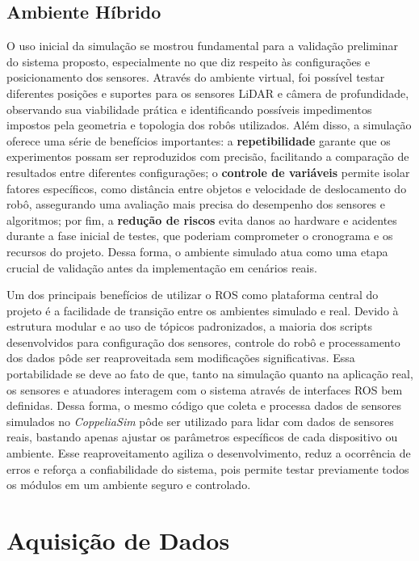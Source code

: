 \subsection{Ambiente Híbrido}

O uso inicial da simulação se mostrou fundamental para a validação preliminar do sistema proposto, especialmente no que diz respeito às configurações e posicionamento dos sensores. Através do ambiente virtual, foi possível testar diferentes posições e suportes para os sensores LiDAR e câmera de profundidade, observando sua viabilidade prática e identificando possíveis impedimentos impostos pela geometria e topologia dos robôs utilizados. Além disso, a simulação oferece uma série de benefícios importantes: a \textbf{repetibilidade} garante que os experimentos possam ser reproduzidos com precisão, facilitando a comparação de resultados entre diferentes configurações; o \textbf{controle de variáveis} permite isolar fatores específicos, como distância entre objetos e velocidade de deslocamento do robô, assegurando uma avaliação mais precisa do desempenho dos sensores e algoritmos; por fim, a \textbf{redução de riscos} evita danos ao hardware e acidentes durante a fase inicial de testes, que poderiam comprometer o cronograma e os recursos do projeto. Dessa forma, o ambiente simulado atua como uma etapa crucial de validação antes da implementação em cenários reais.

Um dos principais benefícios de utilizar o ROS como plataforma central do projeto é a facilidade de transição entre os ambientes simulado e real. Devido à estrutura modular e ao uso de tópicos padronizados, a maioria dos scripts desenvolvidos para configuração dos sensores, controle do robô e processamento dos dados pôde ser reaproveitada sem modificações significativas. Essa portabilidade se deve ao fato de que, tanto na simulação quanto na aplicação real, os sensores e atuadores interagem com o sistema através de interfaces ROS bem definidas. Dessa forma, o mesmo código que coleta e processa dados de sensores simulados no \textit{CoppeliaSim} pôde ser utilizado para lidar com dados de sensores reais, bastando apenas ajustar os parâmetros específicos de cada dispositivo ou ambiente. Esse reaproveitamento agiliza o desenvolvimento, reduz a ocorrência de erros e reforça a confiabilidade do sistema, pois permite testar previamente todos os módulos em um ambiente seguro e controlado.



\section{Aquisição de Dados}

